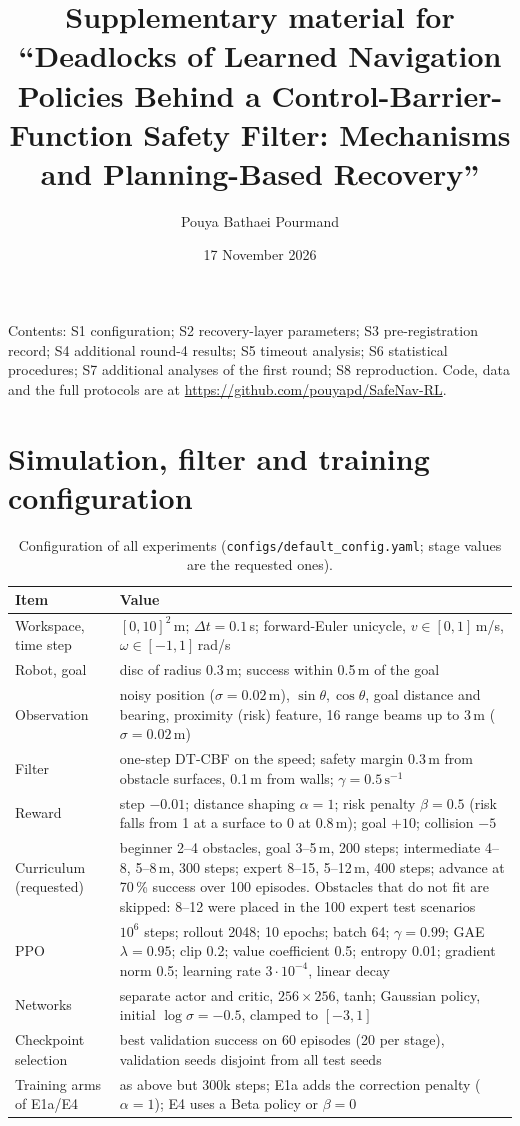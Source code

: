 \documentclass[11pt]{article}
\title{Supplementary material for ``Deadlocks of Learned Navigation Policies Behind a Control-Barrier-Function Safety Filter: Mechanisms and Planning-Based Recovery''}
\author{Pouya Bathaei Pourmand}
\date{17 November 2026}
\begin{document}
\maketitle

\noindent Contents: S1 configuration; S2 recovery-layer parameters; S3 pre-registration record; S4 additional round-4 results; S5 timeout analysis; S6 statistical procedures; S7 additional analyses of the first round; S8 reproduction. Code, data and the full protocols are at \url{https://github.com/pouyapd/SafeNav-RL}.

\section{Simulation, filter and training configuration}
\begin{table}[htbp]
\centering\small
\caption{Configuration of all experiments (\texttt{configs/default\_config.yaml}; stage values are the requested ones).}
\begin{tabularx}{\linewidth}{@{}lX@{}}
\toprule
Item & Value \\
\midrule
Workspace, time step & $[0,10]^2$\,m; $\Delta t=0.1$\,s; forward-Euler unicycle, $v\in[0,1]$\,m/s, $\omega\in[-1,1]$\,rad/s \\
Robot, goal & disc of radius 0.3\,m; success within 0.5\,m of the goal \\
Observation & noisy position ($\sigma=0.02$\,m), $\sin\theta,\cos\theta$, goal distance and bearing, proximity (risk) feature, 16 range beams up to 3\,m ($\sigma=0.02$\,m) \\
Filter & one-step DT-CBF on the speed; safety margin 0.3\,m from obstacle surfaces, 0.1\,m from walls; $\gamma=0.5\,\mathrm{s}^{-1}$ \\
Reward & step $-0.01$; distance shaping $\alpha=1$; risk penalty $\beta=0.5$ (risk falls from 1 at a surface to 0 at 0.8\,m); goal $+10$; collision $-5$ \\
Curriculum (requested) & beginner 2--4 obstacles, goal 3--5\,m, 200 steps; intermediate 4--8, 5--8\,m, 300 steps; expert 8--15, 5--12\,m, 400 steps; advance at 70\,\% success over 100 episodes. Obstacles that do not fit are skipped: 8--12 were placed in the 100 expert test scenarios \\
PPO & $10^6$ steps; rollout 2048; 10 epochs; batch 64; $\gamma=0.99$; GAE $\lambda=0.95$; clip 0.2; value coefficient 0.5; entropy 0.01; gradient norm 0.5; learning rate $3\cdot10^{-4}$, linear decay \\
Networks & separate actor and critic, $256\times256$, tanh; Gaussian policy, initial $\log\sigma=-0.5$, clamped to $[-3,1]$ \\
Checkpoint selection & best validation success on 60 episodes (20 per stage), validation seeds disjoint from all test seeds \\
Training arms of E1a/E4 & as above but 300k steps; E1a adds the correction penalty ($\alpha=1$); E4 uses a Beta policy or $\beta=0$ \\
\bottomrule
\end{tabularx}
\end{table}
\end{document}
